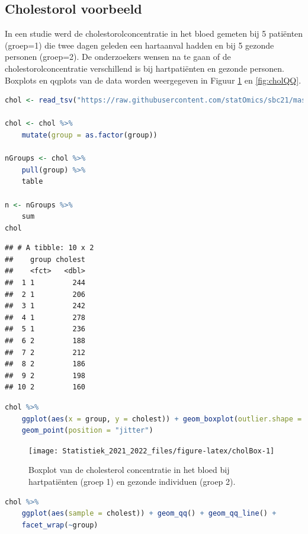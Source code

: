 \documentclass[
  12pt,dutch,coursenotes]{book}
\theoremstyle{definition}
\theoremstyle{definition}
\theoremstyle{definition}
\theoremstyle{definition}
\theoremstyle{remark}
\begin{document}
\hypertarget{cholestorol-voorbeeld}{%
\subsection{Cholestorol voorbeeld}\label{cholestorol-voorbeeld}}

In een studie werd de cholestorolconcentratie in het bloed gemeten bij 5 patiënten (groep=1) die twee dagen geleden een hartaanval hadden en bij 5 gezonde personen (groep=2).
De onderzoekers wensen na te gaan of de cholestorolconcentratie verschillend is bij hartpatiënten en gezonde personen.
Boxplots en qqplots van de data worden weergegeven in Figuur \ref{fig:cholBox} en \ref{fig:cholQQ}.

\begin{lstlisting}[language=R]
chol <- read_tsv("https://raw.githubusercontent.com/statOmics/sbc21/master/data/chol.txt")

chol <- chol %>%
    mutate(group = as.factor(group))

nGroups <- chol %>%
    pull(group) %>%
    table

n <- nGroups %>%
    sum
chol
\end{lstlisting}

\begin{lstlisting}
## # A tibble: 10 x 2
##    group cholest
##    <fct>   <dbl>
##  1 1         244
##  2 1         206
##  3 1         242
##  4 1         278
##  5 1         236
##  6 2         188
##  7 2         212
##  8 2         186
##  9 2         198
## 10 2         160
\end{lstlisting}

\begin{lstlisting}[language=R]
chol %>%
    ggplot(aes(x = group, y = cholest)) + geom_boxplot(outlier.shape = NA) +
    geom_point(position = "jitter")
\end{lstlisting}

\begin{figure}

{\centering \texttt{[image: Statistiek\_2021\_2022\_files/figure-latex/cholBox-1]} 

}

\caption{Boxplot van de cholesterol concentratie in het bloed bij hartpatiënten (groep 1) en gezonde individuen (groep 2).}\label{fig:cholBox}
\end{figure}

\begin{lstlisting}[language=R]
chol %>%
    ggplot(aes(sample = cholest)) + geom_qq() + geom_qq_line() +
    facet_wrap(~group)
\end{lstlisting}
\end{document}
